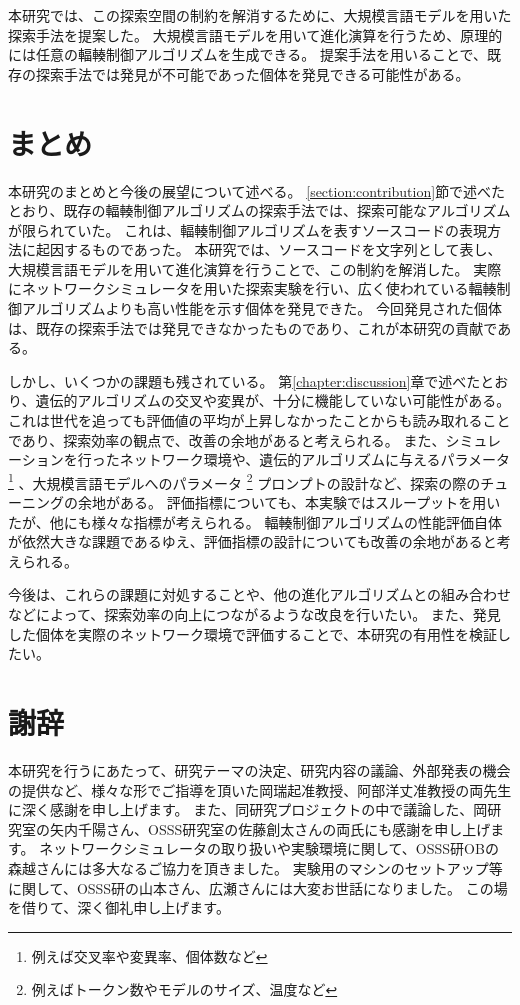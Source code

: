 \documentclass[a4paper,11pt]{jreport}
\newcommand{\chapref}[1]{第\ref{#1}章}
\newcommand{\secref}[1]{\ref{#1}節}
\begin{document}
本研究では、この探索空間の制約を解消するために、大規模言語モデルを用いた探索手法を提案した。
大規模言語モデルを用いて進化演算を行うため、原理的には任意の輻輳制御アルゴリズムを生成できる。
提案手法を用いることで、既存の探索手法では発見が不可能であった個体を発見できる可能性がある。

\newpage

\chapter{まとめ}

本研究のまとめと今後の展望について述べる。
\secref{section:contribution}で述べたとおり、既存の輻輳制御アルゴリズムの探索手法では、探索可能なアルゴリズムが限られていた。
これは、輻輳制御アルゴリズムを表すソースコードの表現方法に起因するものであった。
本研究では、ソースコードを文字列として表し、大規模言語モデルを用いて進化演算を行うことで、この制約を解消した。
実際にネットワークシミュレータを用いた探索実験を行い、広く使われている輻輳制御アルゴリズムよりも高い性能を示す個体を発見できた。
今回発見された個体は、既存の探索手法では発見できなかったものであり、これが本研究の貢献である。

しかし、いくつかの課題も残されている。
\chapref{chapter:discussion}で述べたとおり、遺伝的アルゴリズムの交叉や変異が、十分に機能していない可能性がある。
これは世代を追っても評価値の平均が上昇しなかったことからも読み取れることであり、探索効率の観点で、改善の余地があると考えられる。
また、シミュレーションを行ったネットワーク環境や、遺伝的アルゴリズムに与えるパラメータ
\footnote{例えば交叉率や変異率、個体数など}
、大規模言語モデルへのパラメータ
\footnote{例えばトークン数やモデルのサイズ、温度など}
プロンプトの設計など、探索の際のチューニングの余地がある。
評価指標についても、本実験ではスループットを用いたが、他にも様々な指標が考えられる。
輻輳制御アルゴリズムの性能評価自体が依然大きな課題であるゆえ、評価指標の設計についても改善の余地があると考えられる。

今後は、これらの課題に対処することや、他の進化アルゴリズムとの組み合わせなどによって、探索効率の向上につながるような改良を行いたい。
また、発見した個体を実際のネットワーク環境で評価することで、本研究の有用性を検証したい。

\chapter*{謝辞}

本研究を行うにあたって、研究テーマの決定、研究内容の議論、外部発表の機会の提供など、様々な形でご指導を頂いた岡瑞起准教授、阿部洋丈准教授の両先生に深く感謝を申し上げます。
また、同研究プロジェクトの中で議論した、岡研究室の矢内千陽さん、OSSS研究室の佐藤創太さんの両氏にも感謝を申し上げます。
ネットワークシミュレータの取り扱いや実験環境に関して、OSSS研OBの森越さんには多大なるご協力を頂きました。
実験用のマシンのセットアップ等に関して、OSSS研の山本さん、広瀬さんには大変お世話になりました。
この場を借りて、深く御礼申し上げます。
\end{document}
